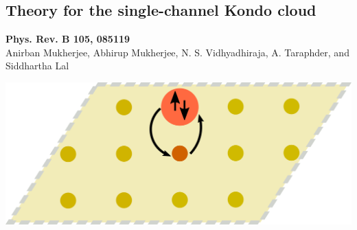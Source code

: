 \documentclass[9pt,aspectratio=169]{beamer}
\begin{document}
\begin{frame}{}
\section{Theory for the single-channel Kondo cloud}
\begin{minipage}{0.55\textwidth}
	\small{{\bf Phys. Rev. B 105, 085119}\\[10pt]
Anirban Mukherjee, \alert{Abhirup Mukherjee}, N. S. Vidhyadhiraja, A. Taraphder, and Siddhartha Lal}
\end{minipage}
\hspace*{\fill}
\begin{minipage}{0.4\textwidth}
	\includegraphics[width=\textwidth]{kondo-effect.pdf}
\end{minipage}
\end{frame}
\end{document}
